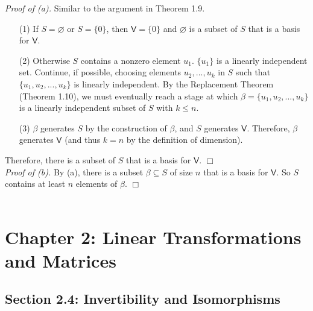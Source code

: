 \documentclass{article}
\begin{document}
\emph{Proof of (a).}
Similar to the argument in Theorem 1.9.
\begin{enumerate}
\item[(1)]
If $S = \varnothing$ or $S = \{0\}$, then $\mathsf{V} = \{0\}$
and $\varnothing$ is a subset of $S$ that is a basis for $\mathsf{V}$.
\item[(2)]
Otherwise $S$ contains a nonzero element $u_1$.
$\{u_1\}$ is a linearly independent set.
Continue, if possible, choosing elements $u_2, ..., u_k$ in $S$ such that
$\{u_1, u_2, ..., u_k\}$ is linearly independent.
By the Replacement Theorem (Theorem 1.10),
we must eventually reach a stage at which
$\beta = \{u_1, u_2, ..., u_k\}$ is a linearly independent subset of $S$
with $k \leq n$.
\item[(3)]
$\beta$ generates $S$ by the construction of $\beta$,
and $S$ generates $\mathsf{V}$.
Therefore, $\beta$ generates $\mathsf{V}$
(and thus $k = n$ by the definition of dimension).
\end{enumerate}
Therefore,
there is a subset of $S$ that is a basis for $\mathsf{V}$.
$\Box$ \\

\emph{Proof of (b).}
By (a), there is a subset $\beta \subseteq S$ of size $n$
that is a basis for $\mathsf{V}$.
So $S$ contains at least $n$ elements of $\beta$.
$\Box$ \\\\






\newpage
\section*{Chapter 2: Linear Transformations and Matrices \\}



\subsection*{Section 2.4: Invertibility and Isomorphisms \\}
\end{document}
